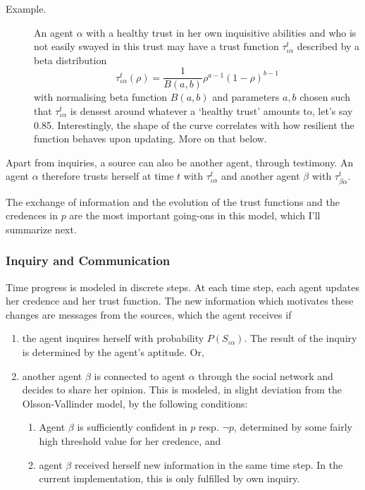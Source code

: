 \documentclass[11pt, a4paper]{scrartcl}
\begin{document}
\begin{description}
    \item[Example.] An agent $\alpha$ with a healthy trust in her own inquisitive abilities and who is not easily swayed in this trust may have a trust function $\tau^t_{\iota\alpha}$ described by a beta distribution
\[
    \tau^t_{\iota\alpha} (\rho) = \frac{1}{B(a,b)} \rho^{a - 1} {(1 - \rho)}^{b-1}
\]
with normalising beta function $B(a,b)$ and parameters $a, b$ chosen such that $\tau^t_{\iota\alpha}$ is densest around whatever a `healthy trust' amounts to, let's say 0.85. Interestingly, the shape of the curve correlates with how resilient the function behaves upon updating. More on that below.
\end{description}
Apart from inquiries, a source can also be another agent, through testimony. An agent $\alpha$ therefore trusts herself at time $t$ with $\tau^t_{\iota\alpha}$ and another agent $\beta$ with $\tau^t_{\beta\alpha}$.

The exchange of information and the evolution of the trust functions and the credences in $p$ are the most important going-ons in this model, which I'll summarize next.

\subsubsection{Inquiry and Communication} 

Time progress is modeled in discrete steps. At each time step, each agent updates her credence and her trust function. The new information which motivates these changes are messages from the sources, which the agent receives if
\begin{enumerate}[label = (\roman*)]
    \item the agent inquires herself with probability $P(S_{\iota\alpha})$. The result of the inquiry is determined by the agent's aptitude. Or,
    \item another agent $\beta$ is connected to agent $\alpha$ through the social network and decides to share her opinion. This is modeled, in slight deviation from the Olsson-Vallinder model, by the following conditions: 
        \begin{enumerate}[label = (\alph*)]
            \item Agent $\beta$ is sufficiently confident in $p$ resp. $\neg p$, determined by some fairly high threshold value for her credence, and
            \item agent $\beta$ received herself new information in the same time step. In the current implementation, this is only fulfilled by own inquiry.  
        \end{enumerate}
\end{enumerate}
\end{document}
